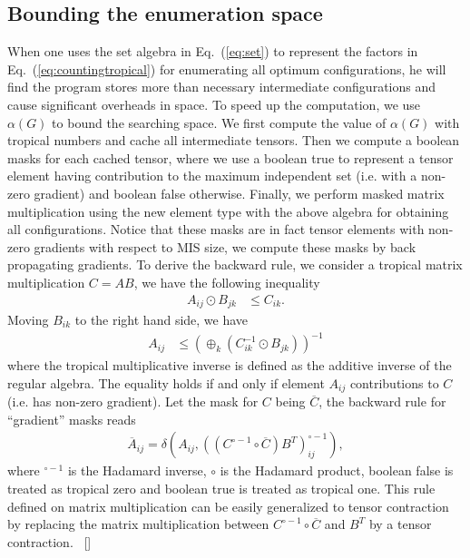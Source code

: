 \documentclass[review,onefignum,onetabnum]{siamart190516}
\newcommand{\<}{\langle}
\renewcommand{\>}{\rangle}
\newcommand{\Eq}[1]{Eq.~(\ref{#1})}
\newcommand{\blue}[1]{[{\bf  \color{blue}{JG: #1}}]}
\begin{document}
\subsection{Bounding the enumeration space}
When one uses the set algebra in \Eq{eq:set} to represent the factors in \Eq{eq:countingtropical} for enumerating all optimum configurations, he will find the program stores more than necessary intermediate configurations and cause significant overheads in space.
To speed up the computation, we use $\alpha(G)$ to bound the searching space.
We first compute the value of $\alpha(G)$ with tropical numbers and cache all intermediate tensors.
Then we compute a boolean masks for each cached tensor, where we use a boolean true to represent a tensor element having contribution to the maximum independent set (i.e. with a non-zero gradient) and boolean false otherwise.
Finally, we perform masked matrix multiplication using the new element type with the above algebra for obtaining all configurations.
Notice that these masks are in fact tensor elements with non-zero gradients with respect to MIS size, we compute these masks by back propagating gradients.
To derive the backward rule, we consider a tropical matrix multiplication $C = A B$, we have the following inequality
\begin{align}
    A_{ij} \odot B_{jk} &\leq C_{ik}.
\end{align}
Moving $B_{ik}$ to the right hand side, we have
\begin{align}
    A_{ij} &\leq (\oplus_{k} (C_{ik}^{-1} \odot B_{jk}))^{-1}
\end{align}
where the tropical multiplicative inverse is defined as the additive inverse of the regular algebra. The equality holds if and only if element $A_{ij}$ contributions to $C$ (i.e. has non-zero gradient).
Let the mask for $C$ being $\overline C$, the backward rule for ``gradient'' masks reads
\begin{align}
\overline{A}_{ij} = \delta(A_{ij}, ((C^{\circ-1} \circ \overline C )B^T)_{ij}^{\circ -1}),
\end{align}
where ${}^{\circ -1}$ is the Hadamard inverse, $\circ$ is the Hadamard product, boolean false is treated as tropical zero and boolean true is treated as tropical one.
This rule defined on matrix multiplication can be easily generalized to tensor contraction by replacing the matrix multiplication between $C^{\circ-1} \circ \overline C$ and $B^T$ by a tensor contraction.~\cite{} \blue{maybe add an appendix?}  %
\end{document}
